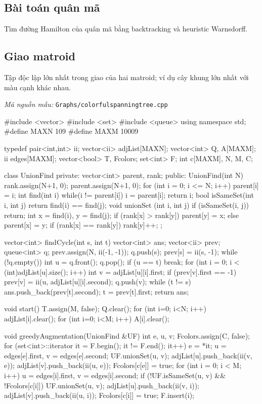 \documentclass[11pt]{article}
\newcommand{\codepath}[1]{\par\noindent\textit{Mã nguồn mẫu:} \texttt{#1}\par}
\begin{document}
\subsection{Bài toán quân mã}

Tìm đường Hamilton của quân mã bằng backtracking và heuristic Warnsdorff.

\subsection{Giao matroid}

Tập độc lập lớn nhất trong giao của hai matroid; ví dụ cây khung lớn nhất với màu cạnh khác nhau.

\codepath{Graphs/colorfulspanningtree.cpp}

\begingroup\scriptsize
\begin{vncode}
#include <vector>
#include <set>
#include <queue>
using namespace std;
#define MAXN 109
#define MAXM 10009

typedef pair<int,int> ii;
vector<ii> adjList[MAXN];
vector<int> Q, A[MAXM];
ii edges[MAXM];
vector<bool> T, Fcolors;
set<int> F;
int c[MAXM], N, M, C;

class UnionFind {
private:
	vector<int> parent, rank;
public:
	UnionFind(int N) {
    	rank.assign(N+1, 0);
		parent.assign(N+1, 0);
		for (int i = 0; i <= N; i++) parent[i] = i;
	}
	int find(int i) {
		while(i != parent[i]) i = parent[i];
		return i;
	}
	bool isSameSet(int i, int j) {
		return find(i) == find(j);
	}
	void unionSet (int i, int j) {
		if (isSameSet(i, j)) return;
		int x = find(i), y = find(j);
		if (rank[x] > rank[y]) parent[y] = x;
		else {
			parent[x] = y;
			if (rank[x] == rank[y]) rank[y]++;
		}
	}
};

vector<int> findCycle(int s, int t) {
	vector<int> ans; vector<ii> prev;
	queue<int> q;
	prev.assign(N, ii(-1, -1));
	q.push(s); prev[s] = ii(s, -1);
	while (!q.empty()) {
		int u = q.front(); q.pop();
		if (u == t) break;
		for (int i = 0; i < (int)adjList[u].size(); i++) {
			int v = adjList[u][i].first;
			if (prev[v].first == -1) {
				prev[v] = ii(u, adjList[u][i].second);
				q.push(v);
			}
		}
	}
	while (t != s) {
		ans.push_back(prev[t].second);
		t = prev[t].first;
	}
	return ans;
}

void start() {
	T.assign(M, false); Q.clear();
	for (int i=0; i<N; i++) adjList[i].clear();
	for (int i=0; i<M; i++) A[i].clear();
}

void greedyAugmentation(UnionFind &UF) {
	int e, u, v;
	Fcolors.assign(C, false);
	for (set<int>::iterator it = F.begin(); it != F.end(); it++) {
		e = *it;
		u = edges[e].first, v = edges[e].second;
		UF.unionSet(u, v);
		adjList[u].push_back(ii(v, e));
		adjList[v].push_back(ii(u, e));
		Fcolors[c[e]] = true;
	}
	for (int i = 0; i < M; i++) {
		u = edges[i].first, v = edges[i].second;
		if (!UF.isSameSet(u, v) && !Fcolors[c[i]]) {
			UF.unionSet(u, v);
			adjList[u].push_back(ii(v, i));
			adjList[v].push_back(ii(u, i));
			Fcolors[c[i]] = true;
			F.insert(i);
		}
	}
}


\end{vncode}
\end{document}
